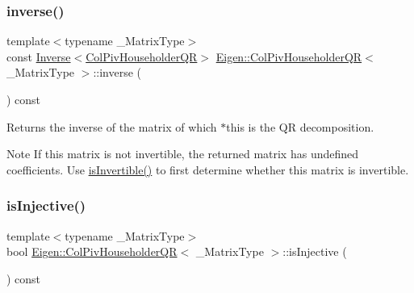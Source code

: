 \subsubsection{\texorpdfstring{inverse()}{inverse()}}
{\footnotesize\ttfamily template$<$typename \+\_\+\+Matrix\+Type$>$ \\
const \mbox{\hyperlink{class_eigen_1_1_inverse}{Inverse}}$<$\mbox{\hyperlink{class_eigen_1_1_col_piv_householder_q_r}{Col\+Piv\+Householder\+QR}}$>$ \mbox{\hyperlink{class_eigen_1_1_col_piv_householder_q_r}{Eigen\+::\+Col\+Piv\+Householder\+QR}}$<$ \+\_\+\+Matrix\+Type $>$\+::inverse (\begin{DoxyParamCaption}{ }\end{DoxyParamCaption}) const\hspace{0.3cm}{\ttfamily [inline]}}

\begin{DoxyReturn}{Returns}
the inverse of the matrix of which $\ast$this is the QR decomposition.
\end{DoxyReturn}
\begin{DoxyNote}{Note}
If this matrix is not invertible, the returned matrix has undefined coefficients. Use \mbox{\hyperlink{class_eigen_1_1_col_piv_householder_q_r_a945720f8d683f8ebe97fa807edd3142a}{is\+Invertible()}} to first determine whether this matrix is invertible. 
\end{DoxyNote}
\mbox{\label{class_eigen_1_1_col_piv_householder_q_r_a0031998053c9c7345c9458f7443aa263}} 
\subsubsection{\texorpdfstring{isInjective()}{isInjective()}}
{\footnotesize\ttfamily template$<$typename \+\_\+\+Matrix\+Type$>$ \\
bool \mbox{\hyperlink{class_eigen_1_1_col_piv_householder_q_r}{Eigen\+::\+Col\+Piv\+Householder\+QR}}$<$ \+\_\+\+Matrix\+Type $>$\+::is\+Injective (\begin{DoxyParamCaption}{ }\end{DoxyParamCaption}) const\hspace{0.3cm}{\ttfamily [inline]}}

